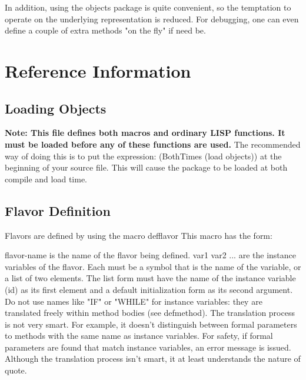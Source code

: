   In addition, using the objects package is quite convenient, so
the temptation to operate on the  underlying  representation  is
reduced.    For debugging, one can even define a couple of extra
methods "on the fly" if need be.

\section{Reference Information}

\subsection{Loading Objects}

{\bf Note: This file defines both macros and ordinary LISP 
functions. It must be loaded before any of these 
functions are used.} The recommended way of doing
this is to  put the expression: (BothTimes (load objects)) at the
beginning   of your source file. This will cause the package to be
loaded   at both compile and load time.

\subsection{Flavor Definition}

  Flavors  are  defined  by using the macro defflavor This macro
has the form:

{}

    flavor-name is the name of the flavor being defined.
    var1 var2 ... are the  instance  variables  of  the  flavor.
    Each must be a symbol that is the name of the variable, or a
    list  of  two elements.  The list form must have the name of
    the instance variable  (id)  as  its  first  element  and  a
    default  initialization form as its second argument.  Do not
    use names like "IF" or "WHILE" for instance variables:  they
    are  translated freely within method bodies (see defmethod).
    The translation process is not very smart.  For example,  it
    doesn't  distinguish  between  formal  parameters to methods
    with the same name as instance variables.   For  safety,  if
    formal  parameters  are found that match instance variables,
    an  error  message  is  issued.   Although  the  translation
    process  isn't  smart, it at least understands the nature of
    quote.

